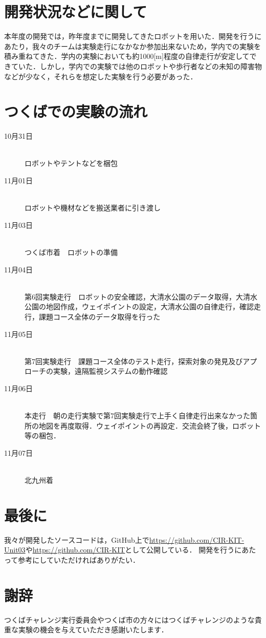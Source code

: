 \documentclass[10pt,a4paper]{jarticle}
\begin{document}
\section{開発状況などに関して}
本年度の開発では，昨年度までに開発してきたロボットを用いた．開発を行うにあたり，我々のチームは実験走行になかなか参加出来ないため，学内での実験を積み重ねてきた．学内の実験においても約1000[m]程度の自律走行が安定してできていた．しかし，学内での実験では他のロボットや歩行者などの未知の障害物などが少なく，それらを想定した実験を行う必要があった．

\section{つくばでの実験の流れ}
\begin{description}
 \item[10月31日]\mbox{}\\
	    ロボットやテントなどを梱包
 \item[11月01日]\mbox{}\\
	    ロボットや機材などを搬送業者に引き渡し
 \item[11月03日]\mbox{}\\
	    つくば市着　ロボットの準備
 \item[11月04日]\mbox{}\\
	    第6回実験走行　ロボットの安全確認，大清水公園のデータ取得，大清水公園の地図作成，ウェイポイントの設定，大清水公園の自律走行，確認走行，課題コース全体のデータ取得を行った
 \item[11月05日]\mbox{}\\
	    第7回実験走行　課題コース全体のテスト走行，探索対象の発見及びアプローチの実験，遠隔監視システムの動作確認
 \item[11月06日]\mbox{}\\
	    本走行　朝の走行実験で第7回実験走行で上手く自律走行出来なかった箇所の地図を再度取得．ウェイポイントの再設定．交流会終了後，ロボット等の梱包．
 \item[11月07日]\mbox{}\\
	    北九州着
\end{description}

\section{最後に}
我々が開発したソースコードは，GitHub上で\url{https://github.com/CIR-KIT-Unit03}や\url{https://github.com/CIR-KIT}として公開している．
開発を行うにあたって参考にしていただければありがたい．


\section*{謝辞}
つくばチャレンジ実行委員会やつくば市の方々にはつくばチャレンジのような貴重な実験の機会を与えていただき感謝いたします．
\end{document}

